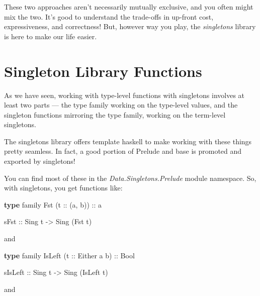 \documentclass[]{article}
\newenvironment{Shaded}{}{}
\newcommand{\DataTypeTok}[1]{\textcolor[rgb]{0.56,0.13,0.00}{#1}}
\newcommand{\FunctionTok}[1]{\textcolor[rgb]{0.02,0.16,0.49}{#1}}
\newcommand{\KeywordTok}[1]{\textcolor[rgb]{0.00,0.44,0.13}{\textbf{#1}}}
\newcommand{\NormalTok}[1]{#1}
\newcommand{\OtherTok}[1]{\textcolor[rgb]{0.00,0.44,0.13}{#1}}
\begin{document}
These two approaches aren't necessarily mutually exclusive, and you often might
mix the two. It's good to understand the trade-offs in up-front cost,
expressiveness, and correctness! But, however way you play, the
\emph{singletons} library is here to make our life easier.

\hypertarget{singleton-library-functions}{%
\section{Singleton Library Functions}\label{singleton-library-functions}}

As we have seen, working with type-level functions with singletons involves at
least two parts --- the type family working on the type-level values, and the
singleton functions mirroring the type family, working on the term-level
singletons.

The singletons library offers template haskell to make working with these things
pretty seamless. In fact, a good portion of Prelude and base is promoted and
exported by singletons!

You can find most of these in the \emph{Data.Singletons.Prelude} module
namespace. So, with singletons, you get functions like:

\begin{Shaded}
\begin{Highlighting}[]
\KeywordTok{type}\NormalTok{ family }\DataTypeTok{Fst}\NormalTok{ (}\OtherTok{t ::}\NormalTok{ (a, b))}\OtherTok{ ::}\NormalTok{ a}

\OtherTok{sFst ::} \DataTypeTok{Sing}\NormalTok{ t }\OtherTok{->} \DataTypeTok{Sing}\NormalTok{ (}\DataTypeTok{Fst}\NormalTok{ t)}
\end{Highlighting}
\end{Shaded}

and

\begin{Shaded}
\begin{Highlighting}[]
\KeywordTok{type}\NormalTok{ family }\DataTypeTok{IsLeft}\NormalTok{ (}\OtherTok{t ::} \DataTypeTok{Either}\NormalTok{ a b)}\OtherTok{ ::} \DataTypeTok{Bool}

\OtherTok{sIsLeft ::} \DataTypeTok{Sing}\NormalTok{ t }\OtherTok{->} \DataTypeTok{Sing}\NormalTok{ (}\DataTypeTok{IsLeft}\NormalTok{ t)}
\end{Highlighting}
\end{Shaded}

and

\begin{Shaded}
\end{Shaded}
\end{document}
